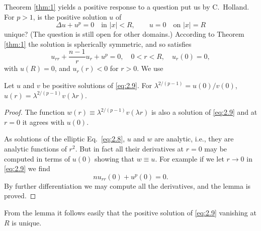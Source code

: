  Theorem \ref{thm:1} yields a positive response to a question put us by C.~Holland.
For $p > 1$, is the positive solution $u$ of
\begin{equation}\label{eq:2.8}
  \Delta u + u^p = 0\quad \text{in } |x|<R,\qquad u = 0\quad \text{on } |x|=R
\end{equation}
unique? (The question is still open for other domains.)
According to Theorem \ref{thm:1} the solution is spherically symmetric, and so satisfies
\begin{equation}\label{eq:2.9}
  u_{rr} + \frac{n-1}{r} u_r + u^p = 0, \quad 0<r<R, \quad u_r(0) = 0,
\end{equation}
with $u(R) = 0$, and $u_r(r)<0$ for $r>0$. We use

\begin{lemma}\label{lemma:2.3}
  Let $u$ and $v$ be positive solutions of \eqref{eq:2.9}.
  For $\lambda^{2/(p-1)} = u(0)/v(0)$, $u(r) = \lambda^{2/(p-1)}v(\lambda r)$.
\end{lemma}

\begin{proof}
  The function $w(r)\equiv \lambda^{2/(p-1)}v(\lambda r)$
  is also a solution of \eqref{eq:2.9} and at $r=0$ it agrees with $u(0)$.

  As solutions of the elliptic Eq.~\eqref{eq:2.8}, $u$ and $w$ are analytic, i.e.,
  they are analytic functions of $r^2$. 
  But in fact all their derivatives at $r = 0$ may be computed in terms of $u(0)$
  showing that $w\equiv u$. For example if we let $r\to 0$ in \eqref{eq:2.9} we find
  \[nu_{rr}(0) + u^p(0) = 0.\]
  By further differentiation we may compute all the derivatives, and the lemma is proved.
\end{proof}

From the lemma it follows easily that the positive solution of \eqref{eq:2.9}
vanishing at $R$ is unique.